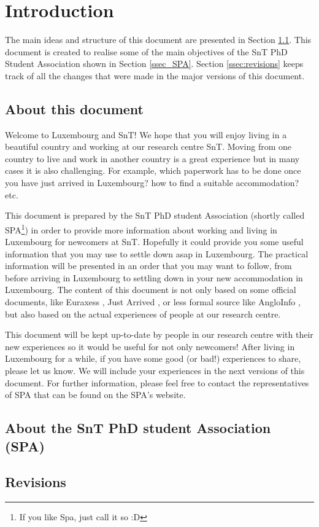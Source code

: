 \section{Introduction}
\label{sect.intro}


The main ideas and structure of this document are presented in Section \ref{ssec_about}. 
This document is created to realise some of the main objectives of the SnT PhD Student Association shown in Section \ref{ssec_SPA}. 
Section \ref{ssec:revisions} keeps track of all the changes that were made in the major versions of this document. 

\subsection{About this document} \label{ssec_about}
Welcome to Luxembourg and SnT! We hope that you will enjoy living in a beautiful country and working at our research centre SnT. Moving from one country to live and work in another country is a great experience but in many cases it is also challenging. For example, which paperwork has to be done once you have just arrived in Luxembourg? how to find a suitable accommodation? etc. 

This document is prepared by the SnT PhD student Association (shortly called SPA\footnote{If you like Spa, just call it so :D}) in order to provide more information about working and living in Luxembourg for newcomers at SnT. Hopefully it could provide you some useful information that you may use to settle down asap in Luxembourg. The practical information will be presented in an order that you may want to follow, from before arriving in Luxembourg to settling down in your new accommodation in Luxembourg. 
The content of this document is not only based on some official documents, like Euraxess \cite{Euraxess}, Just Arrived \cite{JustArrived}, or less formal source like AngloInfo \cite{AngloINFO}, but also based on the actual experiences of people at our research centre. 

This document will be kept up-to-date by people in our research centre with their new experiences so it would be useful for not only newcomers! 
After living in Luxembourg for a while, if you have some good (or bad!) experiences to share, please let us know. 
We will include your experiences in the next versions of this document. 
For further information, please feel free to contact the representatives of SPA that can be found on the SPA's website. 

\subsection{About the SnT PhD student Association (SPA)}


\subsection{Revisions}

